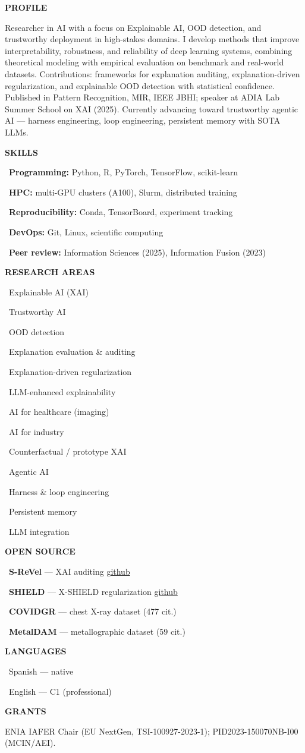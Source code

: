 \documentclass[10pt,a4paper]{article}
\newcommand{\sidehead}[1]{{\small\bfseries\color{sidehead}\uppercase{#1}}\par\vspace{0.15em}}
\newcommand{\sidetext}[1]{{\footnotesize\justifying #1\par}}
\newcommand{\sideitem}[1]{{\footnotesize\textbullet\ #1\par}}
\begin{document}
\noindent
\begin{minipage}[t]{0.32\textwidth}
\colorbox{sidebarbg}{%
\begin{minipage}[t]{0.30\textwidth}
\vspace{0.4em}

\sidehead{Profile}
\sidetext{Researcher in AI with a focus on Explainable AI, OOD detection, and trustworthy deployment in high-stakes domains. I develop methods that improve interpretability, robustness, and reliability of deep learning systems, combining theoretical modeling with empirical evaluation on benchmark and real-world datasets. Contributions: frameworks for explanation auditing, explanation-driven regularization, and explainable OOD detection with statistical confidence. Published in Pattern Recognition, MIR, IEEE JBHI; speaker at ADIA Lab Summer School on XAI (2025). Currently advancing toward trustworthy agentic AI --- harness engineering, loop engineering, persistent memory with SOTA LLMs.}

\vspace{0.3em}

\sidehead{Skills}
\sideitem{\textbf{Programming:} Python, R, PyTorch, TensorFlow, scikit-learn}
\sideitem{\textbf{HPC:} multi-GPU clusters (A100), Slurm, distributed training}
\sideitem{\textbf{Reproducibility:} Conda, TensorBoard, experiment tracking}
\sideitem{\textbf{DevOps:} Git, Linux, scientific computing}
\sideitem{\textbf{Peer review:} Information Sciences (2025), Information Fusion (2023)}
\vspace{0.1em}

\sidehead{Research Areas}
\sideitem{Explainable AI (XAI)}
\sideitem{Trustworthy AI}
\sideitem{OOD detection}
\sideitem{Explanation evaluation \& auditing}
\sideitem{Explanation-driven regularization}
\sideitem{LLM-enhanced explainability}
\sideitem{AI for healthcare (imaging)}
\sideitem{AI for industry}
\sideitem{Counterfactual / prototype XAI}
\sideitem{Agentic AI}
\sideitem{Harness \& loop engineering}
\sideitem{Persistent memory}
\sideitem{LLM integration}
\vspace{0.1em}

\sidehead{Open Source}
\sideitem{\textbf{S-ReVel} --- XAI auditing \href{https://github.com/ari-dasci/S-ReVel}{\tiny github}}
\sideitem{\textbf{SHIELD} --- X-SHIELD regularization \href{https://github.com/isega24/SHIELD}{\tiny github}}
\sideitem{\textbf{COVIDGR} --- chest X-ray dataset (477 cit.)}
\sideitem{\textbf{MetalDAM} --- metallographic dataset (59 cit.)}
\vspace{0.1em}

\sidehead{Languages}
\sideitem{Spanish --- native}
\sideitem{English --- C1 (professional)}
\vspace{0.1em}

\sidehead{Grants}
\sidetext{ENIA IAFER Chair (EU NextGen, TSI-100927-2023-1); PID2023-150070NB-I00 (MCIN/AEI).}

\vspace{0.4em}
\end{minipage}%
}

\end{minipage}\hfill
\end{document}

